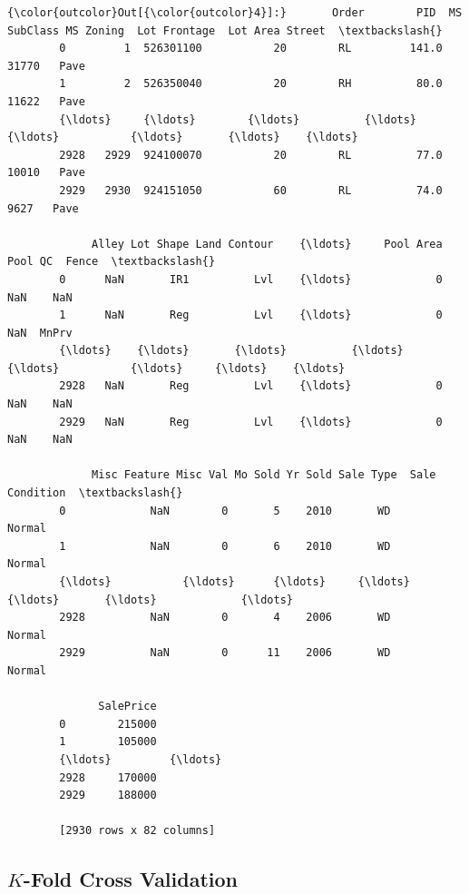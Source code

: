 \documentclass[11pt]{article}
\begin{document}
\begin{Verbatim}[commandchars=\\\{\}]
{\color{outcolor}Out[{\color{outcolor}4}]:}       Order        PID  MS SubClass MS Zoning  Lot Frontage  Lot Area Street  \textbackslash{}
        0         1  526301100           20        RL         141.0     31770   Pave   
        1         2  526350040           20        RH          80.0     11622   Pave   
        {\ldots}     {\ldots}        {\ldots}          {\ldots}       {\ldots}           {\ldots}       {\ldots}    {\ldots}   
        2928   2929  924100070           20        RL          77.0     10010   Pave   
        2929   2930  924151050           60        RL          74.0      9627   Pave   
        
             Alley Lot Shape Land Contour    {\ldots}     Pool Area Pool QC  Fence  \textbackslash{}
        0      NaN       IR1          Lvl    {\ldots}             0     NaN    NaN   
        1      NaN       Reg          Lvl    {\ldots}             0     NaN  MnPrv   
        {\ldots}    {\ldots}       {\ldots}          {\ldots}    {\ldots}           {\ldots}     {\ldots}    {\ldots}   
        2928   NaN       Reg          Lvl    {\ldots}             0     NaN    NaN   
        2929   NaN       Reg          Lvl    {\ldots}             0     NaN    NaN   
        
             Misc Feature Misc Val Mo Sold Yr Sold Sale Type  Sale Condition  \textbackslash{}
        0             NaN        0       5    2010       WD           Normal   
        1             NaN        0       6    2010       WD           Normal   
        {\ldots}           {\ldots}      {\ldots}     {\ldots}     {\ldots}       {\ldots}             {\ldots}   
        2928          NaN        0       4    2006       WD           Normal   
        2929          NaN        0      11    2006       WD           Normal   
        
              SalePrice  
        0        215000  
        1        105000  
        {\ldots}         {\ldots}  
        2928     170000  
        2929     188000  
        
        [2930 rows x 82 columns]
\end{Verbatim}
            
    \hypertarget{k-fold-cross-validation}{%
\subsection{\texorpdfstring{\(K\)-Fold Cross
Validation}{K-Fold Cross Validation}}\label{k-fold-cross-validation}}
\end{document}
